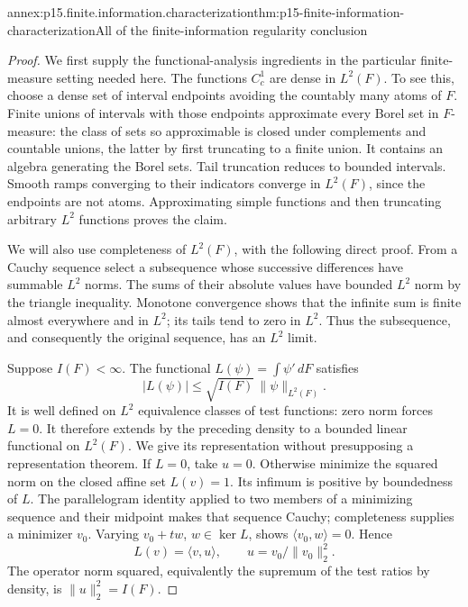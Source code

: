 \begin{annexitem}{annex:p15.finite.information.characterization}{thm:p15-finite-information-characterization}{All of the finite-information regularity conclusion}
\begin{proof}
We first supply the functional-analysis ingredients in the particular
finite-measure setting needed here. The functions \(C_c^1\) are dense
in \(L^2(F)\). To see this, choose a dense set of interval endpoints
avoiding the countably many atoms of \(F\). Finite unions of intervals
with those endpoints approximate every Borel set in \(F\)-measure:
the class of sets so approximable is closed under complements and
countable unions, the latter by first truncating to a finite union.
It contains an algebra generating the Borel sets. Tail truncation
reduces to bounded intervals. Smooth ramps converging to their
indicators converge in \(L^2(F)\), since the endpoints are not atoms.
Approximating simple functions and then truncating arbitrary \(L^2\)
functions proves the claim.

We will also use completeness of \(L^2(F)\), with the following direct
proof. From a Cauchy sequence select a subsequence whose successive
differences have summable \(L^2\) norms. The sums of their absolute
values have bounded \(L^2\) norm by the triangle inequality.
Monotone convergence shows that the infinite sum is finite almost
everywhere and in \(L^2\); its tails tend to zero in \(L^2\).
Thus the subsequence, and consequently the original sequence,
has an \(L^2\) limit.

Suppose \(I(F)<\infty\). The functional
\(L(\psi)=\int\psi'\,dF\) satisfies
\[
 |L(\psi)|\leq\sqrt{I(F)}\,\|\psi\|_{L^2(F)}.
\]
It is well defined on \(L^2\) equivalence classes of test functions:
zero norm forces \(L=0\). It therefore extends by the preceding
density to a bounded linear functional on \(L^2(F)\).
We give its representation without presupposing a representation
theorem. If \(L=0\), take \(u=0\). Otherwise minimize the squared norm
on the closed affine set \(L(v)=1\). Its infimum is positive by
boundedness of \(L\). The parallelogram identity applied to two members
of a minimizing sequence and their midpoint makes that sequence
Cauchy; completeness supplies a minimizer \(v_0\).
Varying \(v_0+t w\), \(w\in\ker L\), shows
\(\langle v_0,w\rangle=0\). Hence
\[
 L(v)=\langle v,u\rangle,\qquad
 u=v_0/\|v_0\|_2^2 .
\]
The operator norm squared, equivalently the supremum of the test
ratios by density, is \(\|u\|_2^2=I(F)\).


\end{proof}
\end{annexitem}

